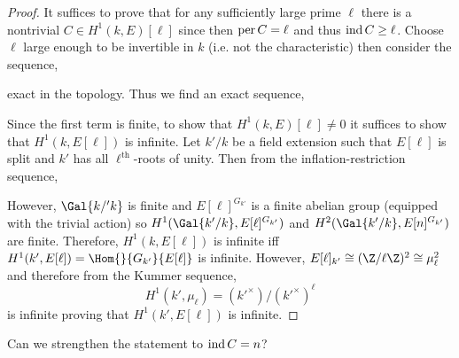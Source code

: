 \documentclass[12pt]{article}
\begin{document}
\begin{proof}
It suffices to prove that for any sufficiently large prime $\ell$ there is a nontrivial $C \in H^1(k, E)[\ell]$ since then $\operatorname{per}{C} = \ell$ and thus $\operatorname{ind}{C} \ge \ell$. Choose $\ell$ large enough to be invertible in $k$ (i.e. not the characteristic) then consider the sequence,
\begin{center}
\end{center}
exact in the \etale topology. Thus we find an exact sequence,
\begin{center}
\end{center}
Since the first term is finite, to show that $H^1(k, E)[\ell] \neq 0$ it suffices to show that $H^1(k, E[\ell])$ is infinite. Let $k'/k$ be a field extension such that $E[\ell]$ is split and $k'$ has all $\ell^{\text{th}}$-roots of unity. Then from the inflation-restriction sequence,
\begin{center}
\end{center}
However, $\Gal{k/'k}$ is finite and $E[\ell]^{G_{k'}}$ is a finite abelian group (equipped with the trivial action) so $H^1(\Gal{k'/k}, E[\ell]^{G_{k'}})$ and $H^2(\Gal{k'/k}, E[n]^{G_{k'}})$ are finite. Therefore, $H^1(k, E[\ell])$ is infinite iff $H^1(k', E[\ell]) = \Hom{}{G_{k'}}{E[\ell]}$ is infinite. However, $E[\ell]_{k'} \cong (\Z / \ell \Z)^2 \cong \mu_\ell^2$ and therefore from the Kummer sequence, 
\[ H^1(k', \mu_\ell) = (k'^\times) / (k'^\times)^\ell \]
is infinite proving that $H^1(k', E[\ell])$ is infinite.
\end{proof}


\begin{rmk}
Can we strengthen the statement to $\operatorname{ind}{C} = n$?
\end{rmk}
\end{document}
